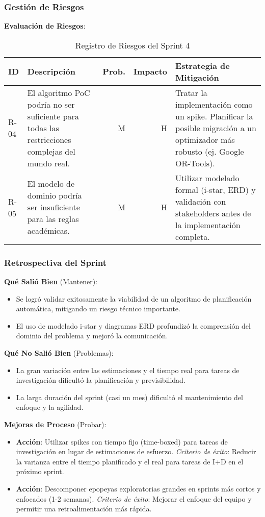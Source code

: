 \subsubsection{Gestión de Riesgos}

\textbf{Evaluación de Riesgos}:
\begin{table}[H]
\caption{Registro de Riesgos del Sprint 4}
\label{tab:risk-register-4}
\begin{tabularx}{\textwidth}{@{}lXrrX@{}}
\toprule
\textbf{ID} & \textbf{Descripción} & \textbf{Prob.} & \textbf{Impacto} & \textbf{Estrategia de Mitigación} \\
\midrule
R-04 & El algoritmo PoC podría no ser suficiente para todas las restricciones complejas del mundo real. & M & H & Tratar la implementación como un spike. Planificar la posible migración a un optimizador más robusto (ej. Google OR-Tools). \\
R-05 & El modelo de dominio podría ser insuficiente para las reglas académicas. & M & H & Utilizar modelado formal (i-star, ERD) y validación con stakeholders antes de la implementación completa. \\
\bottomrule
\end{tabularx}
\end{table}

\subsubsection{Retrospectiva del Sprint}

\textbf{Qué Salió Bien} (Mantener):
\begin{itemize}
    \item Se logró validar exitosamente la viabilidad de un algoritmo de planificación automática, mitigando un riesgo técnico importante.
    \item El uso de modelado i-star y diagramas ERD profundizó la comprensión del dominio del problema y mejoró la comunicación.
\end{itemize}

\textbf{Qué No Salió Bien} (Problemas):
\begin{itemize}
    \item La gran variación entre las estimaciones y el tiempo real para tareas de investigación dificultó la planificación y previsibilidad.
    \item La larga duración del sprint (casi un mes) dificultó el mantenimiento del enfoque y la agilidad.
\end{itemize}

\textbf{Mejoras de Proceso} (Probar):
\begin{itemize}
    \item \textbf{Acción}: Utilizar spikes con tiempo fijo (time-boxed) para tareas de investigación en lugar de estimaciones de esfuerzo. \textit{Criterio de éxito}: Reducir la varianza entre el tiempo planificado y el real para tareas de I+D en el próximo sprint.
    \item \textbf{Acción}: Descomponer epopeyas exploratorias grandes en sprints más cortos y enfocados (1-2 semanas). \textit{Criterio de éxito}: Mejorar el enfoque del equipo y permitir una retroalimentación más rápida.
\end{itemize}

